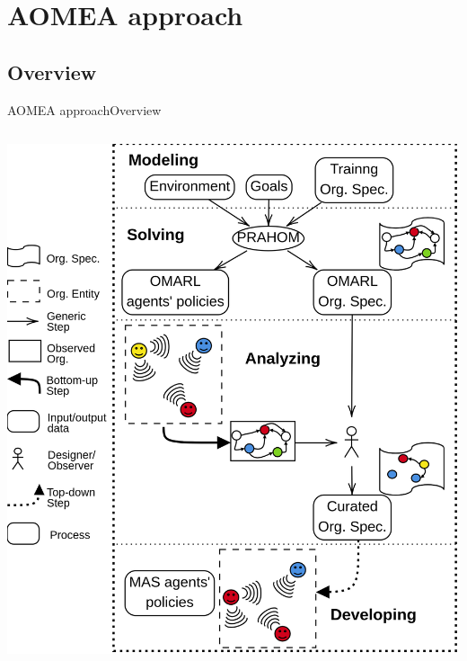 

\section{AOMEA approach}

\subsection{Overview}

\begin{frame}{AOMEA approach}{Overview}

    \begin{columns}

        \begin{column}{0.5\textwidth}

            \centering
            \vspace{-1ex}
            \includegraphics[width=\linewidth]{figures/AOMEA_illustrative_global_view.png}


\end{column}
\end{columns}
\end{frame}

